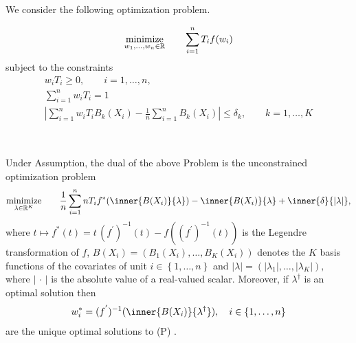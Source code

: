 We consider the following optimization problem.
\begin{problem}
  \begin{gather*}
    \underset{w_1, \ldots, w_n \in \mathbb{R}}{\mathrm{minimize}}
    \qquad
    \sum_{i = 1}^{n} T_i f(w_i)
  \end{gather*}
subject to the constraints
\begin{gather*}
    w_i T_i \ge 0,
    \qquad 
    i = 1, \ldots, n,
    \\
  \sum_{ i = 1 }^{n}
    w_i T_i
  =
  1
  \\
    \left| 
      \sum_{i = 1}^{n} w_i T_i B_k(X_i)
      - 
      \frac{1}{n} \sum_{i = 1}^{n} B_k(X_i)
    \right|
    \le 
    \delta_k,
    \qquad
    k = 1, \ldots, K
\end{gather*}
\end{problem}
\pagebreak
~\begin{ftheorem}
  Under Assumption,
  the dual of the above Problem is the unconstrained optimization problem 
  \begin{gather*}
    \underset{\lambda \in \R^K}{\mathrm{minimize}}
    \qquad
    \frac{1}{n}
    \sum_{i = 1}^{n} 
    nT_i 
    f^*
    (
      \inner{B(X_i)}{\lambda}
    )
    -
    \inner{B(X_i)}{\lambda}
    +
    \inner{\delta}{\left| \lambda \right|}
    ,
  \end{gather*}
  where
  $
  t \mapsto
    f^*(t)
    =
    t\,(f^{'})^{-1}(t)
    -
    f
    \left( 
      (f^{'})^{-1}(t)
    \right)
  $
  is the Legendre transformation of $f$,
  $
    B(X_i)
    =
    \left( 
      B_1(X_i)
      ,
      \ldots
      ,
      B_K(X_i)
    \right)
  $
  denotes the $K$ basis functions of the covariates 
  of unit $i\in \left\{ 1, \ldots, n \right\}$
  and
  $
    \left| \lambda \right|
    =
    \left( 
      \left| \lambda_1 \right|
      ,
      \ldots
      ,
      \left| \lambda_K \right|
    \right)
    ,
  $
  where $\left| \,\cdot\, \right|$
  is the absolute value of a real-valued scalar.
  Moreover, if $\lambda^\dagger$
  is an optimal solution then
  \begin{gather}
    w_i^*
    =
    (f^{'})^{-1}
    (
      \inner{B(X_i)}{\lambda^\dagger}
    )
    ,
    \quad
    i\in \left\{ 1,\ldots, n \right\}
  \end{gather}
  are the unique optimal solutions to (P)
  .
\end{ftheorem}
